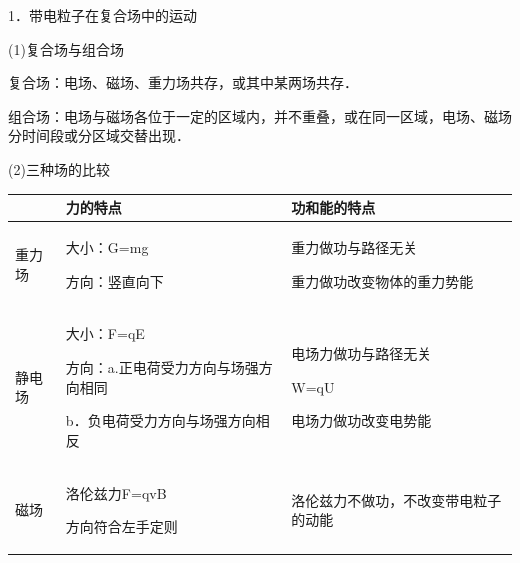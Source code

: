 \documentclass[cn,10.5pt,chinese,mac,chinesefont=founder]{elegantbook}
\begin{document}
1．带电粒子在复合场中的运动

(1)复合场与组合场

复合场：电场、磁场、重力场共存，或其中某两场共存．

组合场：电场与磁场各位于一定的区域内，并不重叠，或在同一区域，电场、磁场分时间段或分区域交替出现．

(2)三种场的比较

\begin{longtable}[]{@{}m{1cm}m{6cm}m{5cm}@{}}
\toprule
 & \begin{minipage}[b]{0.30\columnwidth}\raggedright
力的特点\strut
\end{minipage} & \begin{minipage}[b]{0.30\columnwidth}\raggedright
功和能的特点\strut
\end{minipage}\tabularnewline
\midrule
\endhead
\begin{minipage}[t]{0.30\columnwidth}\raggedright
重力场\strut
\end{minipage} & \begin{minipage}[t]{0.30\columnwidth}\raggedright
大小：G=mg

方向：竖直向下\strut
\end{minipage} & \begin{minipage}[t]{0.50\columnwidth}\raggedright
重力做功与路径无关

重力做功改变物体的重力势能\strut
\end{minipage}\tabularnewline
\begin{minipage}[t]{0.30\columnwidth}\raggedright
静电场\strut
\end{minipage} & \begin{minipage}[t]{0.50\columnwidth}\raggedright
大小：F=qE

方向：a.正电荷受力方向与场强方向相同

b．负电荷受力方向与场强方向相反\strut
\end{minipage} & \begin{minipage}[t]{0.30\columnwidth}\raggedright
电场力做功与路径无关

W=qU

电场力做功改变电势能\strut
\end{minipage}\tabularnewline
\begin{minipage}[t]{0.30\columnwidth}\raggedright
磁场\strut
\end{minipage} & \begin{minipage}[t]{0.30\columnwidth}\raggedright
洛伦兹力F=qvB

方向符合左手定则\strut
\end{minipage} & \begin{minipage}[t]{0.30\columnwidth}\raggedright
洛伦兹力不做功，不改变带电粒子的动能\strut
\end{minipage}\tabularnewline
\bottomrule
\end{longtable}
\end{document}
